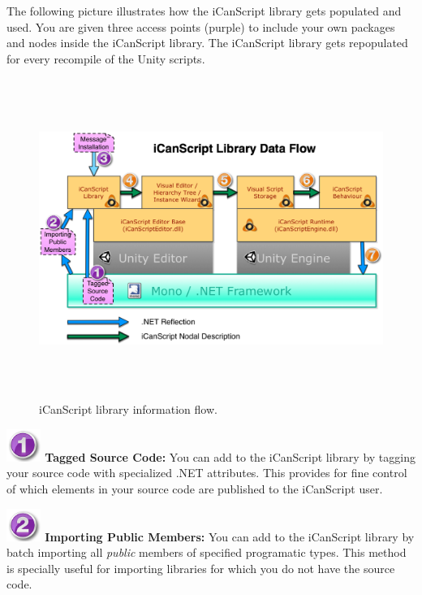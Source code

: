 The following picture illustrates how the iCanScript library gets populated and used. You are given three access points (purple) to include your own packages and nodes inside the iCanScript library. The iCanScript library gets repopulated for every recompile of the Unity scripts.

\begin{figure}[htbp]
\centering
\includegraphics[width=479pt,height=295pt]{extending-node-information-flow.png}
\caption{iCanScript library information flow.}
\label{extending-node-information-flow.png}
\end{figure}

\includegraphics[width=32pt,height=30pt]{stamp-1-purple.png} \textbf{Tagged Source Code:} You can add to the iCanScript library by tagging your source code with specialized .NET attributes. This provides for fine control of which elements in your source code are published to the iCanScript user.

\includegraphics[width=32pt,height=30pt]{stamp-2-purple.png} \textbf{Importing Public Members:} You can add to the iCanScript library by batch importing all \emph{public} members of specified programatic types. This method is specially useful for importing libraries for which you do not have the source code.

